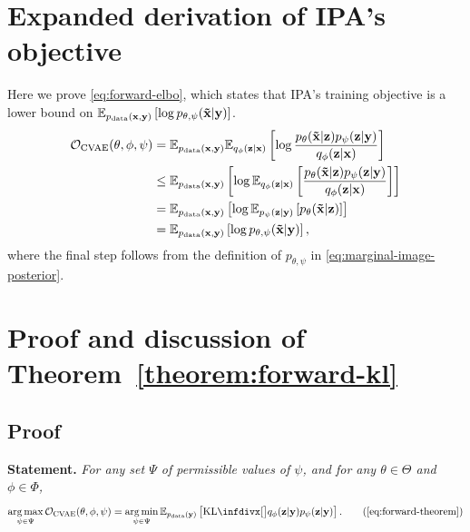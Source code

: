 \section{Expanded derivation of IPA's objective} \label{supp:cigcvae-forward-elbo-bound-deriv}
Here we prove \cref{eq:forward-elbo}, which states that IPA's training
objective is a lower bound on $\mathbb{E}_{p_{\rm{data}} ({\mathbf{x}}, {\mathbf{y}})} \left[ \log
  p_{\theta,\psi}(\mathbf{\tilde{x}}{}|{\mathbf{y}}) \right]$.
\begin{align}
  {\mathcal{O}}_\text{CVAE}(\theta, \phi, \psi ) &= \mathbb{E}_{p_{\rm{data}} ({\mathbf{x}}, {\mathbf{y}})} \mathbb{E}_{q_\phi({\mathbf{z}}|{\mathbf{x}})} \left[ \log \frac{p_\theta(\mathbf{\tilde{x}}{}|{\mathbf{z}})p_\psi({\mathbf{z}}|{\mathbf{y}})}{q_\phi({\mathbf{z}}|{\mathbf{x}})} \right] \\
                                                   &\leq \mathbb{E}_{p_{\rm{data}} ({\mathbf{x}}, {\mathbf{y}})} \left[ \log \mathbb{E}_{q_\phi({\mathbf{z}}|{\mathbf{x}})} \left[ \frac{p_\theta(\mathbf{\tilde{x}}{}|{\mathbf{z}})p_\psi({\mathbf{z}}|{\mathbf{y}})}{q_\phi({\mathbf{z}}|{\mathbf{x}})} \right]  \right] \\
                                                   &= \mathbb{E}_{p_{\rm{data}} ({\mathbf{x}}, {\mathbf{y}})} \left[ \log \mathbb{E}_{p_\psi({\mathbf{z}}|{\mathbf{y}})} \left[ p_\theta(\mathbf{\tilde{x}}{}|{\mathbf{z}}) \right]  \right] \\
                                                   &= \mathbb{E}_{p_{\rm{data}} ({\mathbf{x}}, {\mathbf{y}})} \left[ \log p_{\theta,\psi}(\mathbf{\tilde{x}}{}|{\mathbf{y}}) \right],
\end{align}
where the final step follows from the definition of $p_{\theta,\psi}$ in
\cref{eq:marginal-image-posterior}.


\section{Proof and discussion of Theorem~\ref{theorem:forward-kl}} \label{proof:forward-kl}
\subsection{Proof}
\textbf{Statement.}
\textit{
  For any set $\Psi$ of
  permissible values of $\psi $, and for any $\theta\in\Theta$ and
  $\phi\in\Phi$,
  \begin{equation}
    \argmax_{\psi  \in \Psi} \gO_\text{CVAE}(\theta, \phi, \psi ) = \argmin_{\psi  \in \Psi} \EX_{\pdata (\rvy)} \left[ \kl[\big]{ q_\phi(\rvz|\rvy) }{ p_\psi(\rvz|\rvy) } \right]. \tag{\ref{eq:forward-theorem}}
  \end{equation}
}

